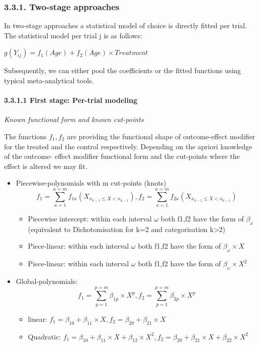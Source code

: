 \documentclass[14pt,]{article}
\providecommand{\tightlist}{%
  \setlength{\itemsep}{0pt}\setlength{\parskip}{0pt}}
\let\oldparagraph\paragraph
\renewcommand{\paragraph}[1]{\oldparagraph{#1}\mbox{}}
\begin{document}
\subsubsection{3.3.1. Two-stage approaches}\label{two-stage-approaches}

In two-stage approaches a statistical model of choice is directly fitted
per trial. The statistical model per trial j is as follows:

\(g(Y_{ij}) = f_1(Age) + f_2(Age) \times Treatment\)

Subsequently, we can either pool the coefficients or the fitted
functions using typical meta-analytical tools.

\paragraph{3.3.1.1 First stage: Per-trial
modeling}\label{first-stage-per-trial-modeling}

\emph{Known functional form and known cut-points}

The functions \(f_1, f_2\) are providing the functional shape of
outcome-effect modifier for the treated and the control respectively.
Depending on the apriori knowledge of the outcome- effect modifier
functional form and the cut-points where the effect is altered we may
fit.

\begin{itemize}
\tightlist
\item
  Piecewise-polynomials with m cut-points (knots)
  \[f_1 = \sum_{\kappa =1}^{\kappa= m}f_{1\kappa}(X_{x_{k-1} \leq X < x_{k-1}} ), f_2 =  \sum_{\kappa =1}^{\kappa= m}f_{2\kappa}(X_{x_{k-1} \leq X < x_{k-1}} )\]

  \begin{itemize}
  \tightlist
  \item
    Piecewise intercept: within each interval \(\omega\) both f1,f2 have
    the form of \(\beta_{\omega}\) (equivalent to Dichotomisation for
    k=2 and categorisation k\textgreater{}2)
  \item
    Piece-linear: within each interval \(\omega\) both f1,f2 have the
    form of \(\beta_{\omega} \times X\)
  \item
    Piece-linear: within each interval \(\omega\) both f1,f2 have the
    form of \(\beta_{\omega} \times X^2\)
  \end{itemize}
\item
  Global-polynomials:
  \[f_1 =  \sum_{p=1}^{p=m} \beta_{1p} \times X^p , f_2 = \sum_{p=1}^{p=m} \beta_{2p} \times X^p\]

  \begin{itemize}
  \tightlist
  \item
    linear:
    \(f_1 = \beta_{10} + \beta_{11} \times X , f_2 = \beta_{20} + \beta_{21} \times X\)
  \item
    Quadratic:
    \(f_1 = \beta_{10} + \beta_{11} \times X + \beta_{12} \times X^2 , f_2 = \beta_{20} + \beta_{21} \times X + \beta_{22} \times X^2\)
  \end{itemize}
\end{itemize}
\end{document}
